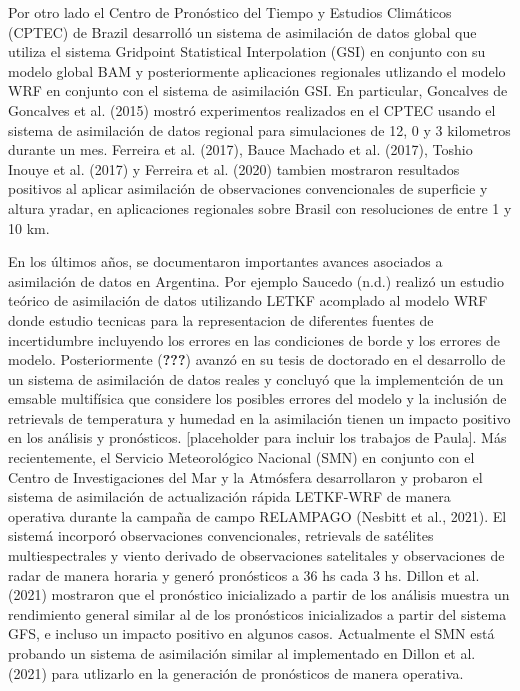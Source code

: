 \documentclass[12pt,twoside]{reedthesis}
\begin{document}
Por otro lado el Centro de Pronóstico del Tiempo y Estudios Climáticos (CPTEC) de Brazil desarrolló un sistema de asimilación de datos global que utiliza el sistema Gridpoint Statistical Interpolation (GSI) en conjunto con su modelo global BAM y posteriormente aplicaciones regionales utlizando el modelo WRF en conjunto con el sistema de asimilación GSI. En particular, Goncalves de Goncalves et al. (2015) mostró experimentos realizados en el CPTEC usando el sistema de asimilación de datos regional para simulaciones de 12, 0 y 3 kilometros durante un mes. Ferreira et al. (2017), Bauce Machado et al. (2017), Toshio Inouye et al. (2017) y Ferreira et al. (2020) tambien mostraron resultados positivos al aplicar asimilación de observaciones convencionales de superficie y altura yradar, en aplicaciones regionales sobre Brasil con resoluciones de entre 1 y 10 km.

En los últimos años, se documentaron importantes avances asociados a asimilación de datos en Argentina. Por ejemplo Saucedo (n.d.) realizó un estudio teórico de asimilación de datos utilizando LETKF acomplado al modelo WRF donde estudio tecnicas para la representacion de diferentes fuentes de incertidumbre incluyendo los errores en las condiciones de borde y los errores de modelo. Posteriormente ({\textbf{???}}) avanzó en su tesis de doctorado en el desarrollo de un sistema de asimilación de datos reales y concluyó que la implementción de un emsable multifísica que considere los posibles errores del modelo y la inclusión de retrievals de temperatura y humedad en la asimilación tienen un impacto positivo en los análisis y pronósticos. {[}placeholder para incluir los trabajos de Paula{]}. Más recientemente, el Servicio Meteorológico Nacional (SMN) en conjunto con el Centro de Investigaciones del Mar y la Atmósfera desarrollaron y probaron el sistema de asimilación de actualización rápida LETKF-WRF de manera operativa durante la campaña de campo RELAMPAGO (Nesbitt et al., 2021). El sistemá incorporó observaciones convencionales, retrievals de satélites multiespectrales y viento derivado de observaciones satelitales y observaciones de radar de manera horaria y generó pronósticos a 36 hs cada 3 hs. Dillon et al. (2021) mostraron que el pronóstico inicializado a partir de los análisis muestra un rendimiento general similar al de los pronósticos inicializados a partir del sistema GFS, e incluso un impacto positivo en algunos casos. Actualmente el SMN está probando un sistema de asimilación similar al implementado en Dillon et al. (2021) para utlizarlo en la generación de pronósticos de manera operativa.
\end{document}

